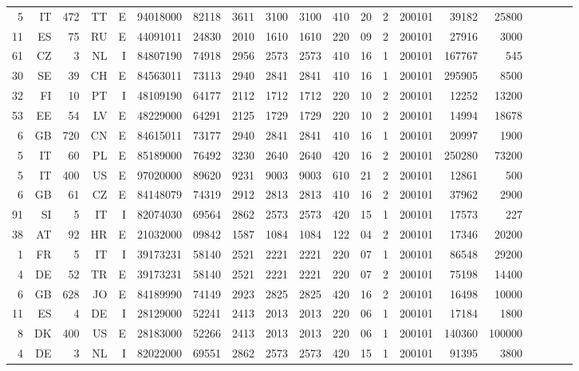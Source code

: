 {\begin{tabular}{rrrrrrrrrrrrrrrrrrrr}
 5 & IT & 472 & TT & E & 94018000 & 82118 & 3611 & 3100 & 3100 & 410 & 20 & 2 & 200101 & 39182 & 25800 \\
 11 & ES & 75 & RU & E & 44091011 & 24830 & 2010 & 1610 & 1610 & 220 & 09 & 2 & 200101 & 27916 & 3000 \\
 61 & CZ & 3 & NL & I & 84807190 & 74918 & 2956 & 2573 & 2573 & 410 & 16 & 1 & 200101 & 167767 & 545 \\
 30 & SE & 39 & CH & E & 84563011 & 73113 & 2940 & 2841 & 2841 & 410 & 16 & 1 & 200101 & 295905 & 8500 \\
 32 & FI & 10 & PT & I & 48109190 & 64177 & 2112 & 1712 & 1712 & 220 & 10 & 2 & 200101 & 12252 & 13200 \\
 53 & EE & 54 & LV & E & 48229000 & 64291 & 2125 & 1729 & 1729 & 220 & 10 & 2 & 200101 & 14994 & 18678 \\
 6 & GB & 720 & CN & E & 84615011 & 73177 & 2940 & 2841 & 2841 & 410 & 16 & 1 & 200101 & 20997 & 1900 \\
 5 & IT & 60 & PL & E & 85189000 & 76492 & 3230 & 2640 & 2640 & 420 & 16 & 2 & 200101 & 250280 & 73200 \\
 5 & IT & 400 & US & E & 97020000 & 89620 & 9231 & 9003 & 9003 & 610 & 21 & 2 & 200101 & 12861 & 500 \\
 6 & GB & 61 & CZ & E & 84148079 & 74319 & 2912 & 2813 & 2813 & 410 & 16 & 2 & 200101 & 37962 & 2900 \\
 91 & SI & 5 & IT & I & 82074030 & 69564 & 2862 & 2573 & 2573 & 420 & 15 & 1 & 200101 & 17573 & 227 \\
 38 & AT & 92 & HR & E & 21032000 & 09842 & 1587 & 1084 & 1084 & 122 & 04 & 2 & 200101 & 17346 & 20200 \\
 1 & FR & 5 & IT & I & 39173231 & 58140 & 2521 & 2221 & 2221 & 220 & 07 & 1 & 200101 & 86548 & 29200 \\
 4 & DE & 52 & TR & E & 39173231 & 58140 & 2521 & 2221 & 2221 & 220 & 07 & 2 & 200101 & 75198 & 14400 \\
 6 & GB & 628 & JO & E & 84189990 & 74149 & 2923 & 2825 & 2825 & 420 & 16 & 2 & 200101 & 16498 & 10000 \\
 11 & ES & 4 & DE & I & 28129000 & 52241 & 2413 & 2013 & 2013 & 220 & 06 & 1 & 200101 & 17184 & 1800 \\
 8 & DK & 400 & US & E & 28183000 & 52266 & 2413 & 2013 & 2013 & 220 & 06 & 1 & 200101 & 140360 & 100000 \\
 4 & DE & 3 & NL & I & 82022000 & 69551 & 2862 & 2573 & 2573 & 420 & 15 & 1 & 200101 & 91395 & 3800 \\

\end{tabular}}
